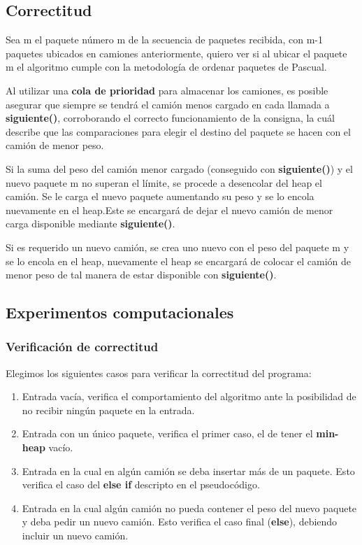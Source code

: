 \documentclass[a4paper, 10pt, twoside]{article}
\begin{document}
\subsection{Correctitud}
Sea m el paquete número m de la secuencia de paquetes recibida, con m-1 paquetes ubicados en camiones anteriormente, quiero ver si al ubicar el paquete m el algoritmo cumple con la metodología de ordenar paquetes de Pascual.

Al utilizar una \textbf{cola de prioridad} para almacenar los camiones, es posible asegurar que siempre se tendrá el camión menos cargado en cada llamada a \textbf{siguiente()}, corroborando el correcto funcionamiento de la consigna, la cuál describe que las comparaciones para elegir el destino del paquete se hacen con el camión de menor peso. 

Si la suma del peso del camión menor cargado (conseguido con \textbf{siguiente()}) y el nuevo paquete m no superan el límite, se procede a desencolar del heap el camión. Se le carga el nuevo paquete aumentando su peso y se lo encola nuevamente en el heap.Este se encargará de dejar el nuevo camión de menor carga disponible mediante \textbf{siguiente()}.

Si es requerido un nuevo camión, se crea uno nuevo con el peso del paquete m y se lo encola en el heap, nuevamente el heap se encargará de colocar el camión de menor peso de tal manera de estar disponible con \textbf{siguiente()}.

\subsection{Experimentos computacionales}
\subsubsection{Verificación de correctitud}
Elegimos los siguientes casos para verificar la correctitud del programa:
\begin{enumerate}
	\item Entrada vacía, verifica el comportamiento del algoritmo ante la posibilidad de no recibir ningún paquete en la entrada.
	\item Entrada con un único paquete, verifica el primer caso, el de tener el \textbf{min-heap} vacío.
	\item Entrada en la cual en algún camión se deba insertar más de un paquete. Esto verifica el caso del \textbf{else if} descripto en el pseudocódigo.
	\item Entrada en la cual algún camión no pueda contener el peso del nuevo paquete y deba pedir un nuevo camión. Esto verifica el caso final (\textbf{else}), debiendo incluir un nuevo camión.
\end{enumerate}
\end{document}
